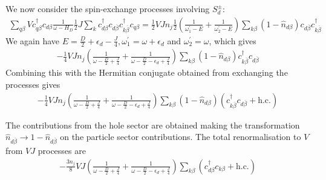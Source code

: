 \documentclass{report}
\numberwithin{equation}{section}
\begin{document}
\begin{appendices}
We now consider the spin-exchange processes involving \(S_d^\pm\):
\begin{equation}\begin{aligned}
	\sum_{q\beta} Vc^\dagger_{q\beta} c_{d\beta} \frac{1}{\omega - H_D}\frac{1}{2}J \sum_{k} c^\dagger_{d\beta}c_{d\overline\beta} c^\dagger_{k\overline\beta}c_{q\beta} = \frac{1}{2}V J n_j \frac{1}{2}\left(\frac{1}{\omega^\prime_1 - E} + \frac{1}{\omega^\prime_2 - E}\right) \sum_{k\beta} \left(1 - \hat n_{d\beta}\right) c_{d\overline\beta}c^\dagger_{k\overline\beta}
\end{aligned}\end{equation}
We again have \(E = \frac{D}{2} + \epsilon_d - \frac{J}{4},\omega_1^\prime = \omega + \epsilon_d\) and \(\omega_2^\prime = \omega\), which gives
\begin{equation}\begin{aligned}
	-\frac{1}{4}V J n_j \left(\frac{1}{\omega - \frac{D}{2} + \frac{J}{4}} + \frac{1}{\omega - \frac{D}{2} - \epsilon_d + \frac{J}{4}}\right) \sum_{k\beta} \left(1 - \hat n_{d\beta}\right)c^\dagger_{k\overline\beta} c_{d\overline\beta}
\end{aligned}\end{equation}
Combining this with the Hermitian conjugate obtained from exchanging the processes gives
\begin{equation}\begin{aligned}
	-\frac{1}{4}V J n_j \left(\frac{1}{\omega - \frac{D}{2} + \frac{J}{4}} + \frac{1}{\omega - \frac{D}{2} - \epsilon_d + \frac{J}{4}}\right) \sum_{k\beta} \left(1 - \hat n_{d\beta}\right)\left(c^\dagger_{k\overline\beta} c_{d\overline\beta} + \text{h.c.}\right)
\end{aligned}\end{equation}

The contributions from the hole sector are obtained making the transformation \(\hat n_{d\overline\beta} \to 1 - \hat n_{d\overline\beta}\) on the particle sector contributions. The total renormalisation to \(V\) from \(VJ\) processes are
\begin{equation}\begin{aligned}
	-\frac{3n_j}{8}V J \left(\frac{1}{\omega - \frac{D}{2} + \frac{J}{4}} + \frac{1}{\omega - \frac{D}{2} - \epsilon_d + \frac{J}{4}}\right) \sum_{k\beta}\left(c^\dagger_{d\beta} c_{k\beta} + \text{h.c.}\right)
\end{aligned}\end{equation}


\end{appendices}
\end{document}
